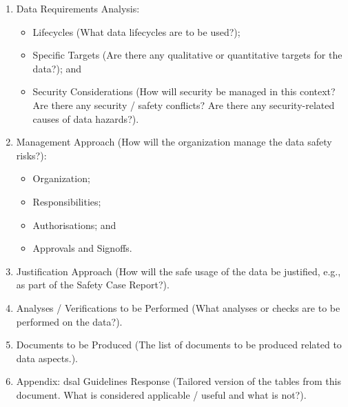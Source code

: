 \begin{enumerate}
  \item Data Requirements Analysis:
  \begin{itemize}
    \item Lifecycles (What data lifecycles are to be used?);
    \item Specific Targets (Are there any qualitative or quantitative targets for the data?); and
    \item Security Considerations (How will security be managed in this context? Are there any security / safety conflicts? Are there any security-related causes of data \glspl{hazard}?).
  \end{itemize}
  \item Management Approach (How will the organization manage the data safety risks?):
  \begin{itemize}
    \item Organization;
    \item Responsibilities;
    \item Authorisations; and
    \item Approvals and Signoffs.
  \end{itemize}
  \item Justification Approach (How will the safe usage of the data be justified, e.g., as part of the Safety Case Report?). 
  \item Analyses / Verifications to be Performed (What analyses or checks are to be performed on the data?).
  \item Documents to be Produced (The list of documents to be produced related to data aspects.).
  \item Appendix: \gls{dsal} Guidelines Response (Tailored version of the tables from this document. What is considered applicable / useful and what is not?).
\end{enumerate}
